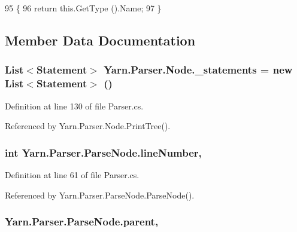 \begin{DoxyCode}
95             \{
96                 \textcolor{keywordflow}{return} this.GetType ().Name;
97             \}
\end{DoxyCode}


\subsection{Member Data Documentation}
\hypertarget{a00132_ae910a20906be9b1964499efaefa48274}{
\subsubsection[{\-\_\-statements}]{\setlength{\rightskip}{0pt plus 5cm}List$<${\bf Statement}$>$ Yarn.\-Parser.\-Node.\-\_\-statements = new List$<${\bf Statement}$>$ ()\hspace{0.3cm}{\ttfamily [private]}}}\label{a00132_ae910a20906be9b1964499efaefa48274}


Definition at line 130 of file Parser.\-cs.



Referenced by Yarn.\-Parser.\-Node.\-Print\-Tree().

\hypertarget{a00142_a18b493382de0fde5b4299c1bd2250075}{
\subsubsection[{line\-Number}]{\setlength{\rightskip}{0pt plus 5cm}int Yarn.\-Parser.\-Parse\-Node.\-line\-Number\hspace{0.3cm}{\ttfamily [package]}, {\ttfamily [inherited]}}}\label{a00142_a18b493382de0fde5b4299c1bd2250075}


Definition at line 61 of file Parser.\-cs.



Referenced by Yarn.\-Parser.\-Parse\-Node.\-Parse\-Node().

\hypertarget{a00142_af313a82103fcc2ff5a177dbb06b92f7b}{
\subsubsection[{parent}]{ Yarn.\-Parser.\-Parse\-Node.\-parent\hspace{0.3cm}{\ttfamily [package]}, {\ttfamily [inherited]}}}\label{a00142_af313a82103fcc2ff5a177dbb06b92f7b}


